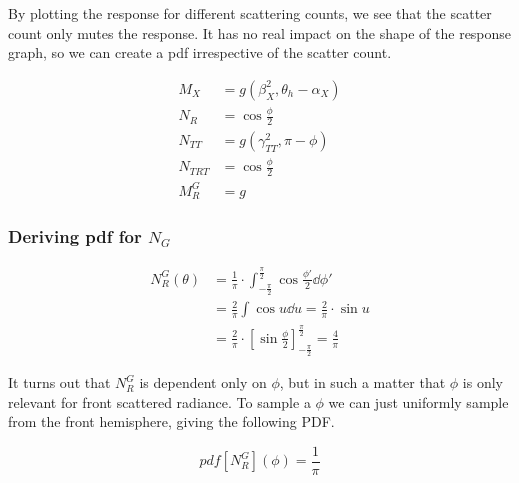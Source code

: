 \documentclass[12pt,a4paper,twoside]{article}
\begin{document}
By plotting the response for different scattering counts, we see that the scatter count only mutes the response. It has no real impact on the shape of the response graph, so we can create a pdf irrespective of the scatter count.


\begin{align*}
M_X & = g(\beta_X^2, \theta_h - \alpha_X) \\
N_R & = \cos\frac{\phi}{2} \\
N_{TT} & = g(\gamma_{TT}^2, \pi - \phi) \\
N_{TRT} & = \cos\frac{\phi}{2} \\
M_R^G & = g
\end{align*}


\subsubsection{Deriving pdf for $N_G$}

\begin{equation}
\begin{split}
N_R^G(\theta) & = \frac{1}{\pi} \cdot \int_{-\frac{\pi}{2}}^{\frac{\pi}{2}} \cos \frac{\phi'}{2} \dd{\phi'} \\
 & = \frac{2}{\pi} \int \cos u \dd{u}  = \frac{2}{\pi} \cdot \sin u \\
 & = \frac{2}{\pi} \cdot \left[\sin \frac{\phi}{2}\right]_{-\frac{\pi}{2}}^{\frac{\pi}{2}} = \frac{4}{\pi}
\end{split}
\end{equation}

It turns out that $N_R^G$ is dependent only on $\phi$, but in such a matter that $\phi$ is only relevant for front scattered radiance. To sample a $\phi$ we can just uniformly sample from the front hemisphere, giving the following PDF.

\begin{equation}
pdf[ N_R^G ](\phi) = \frac{1}{\pi}
\end{equation}



 
\end{document}
